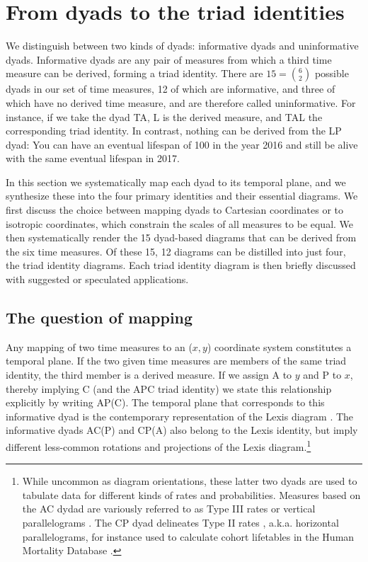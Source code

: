 \documentclass[12pt,oneside,a4paper]{article} %
\begin{document}

\section{From dyads to the triad identities}
We distinguish between two kinds of dyads: informative dyads and uninformative dyads. Informative dyads are any pair of measures from which a third time measure
can be derived, forming a triad identity. There are
$15=\binom{6}{2}$ possible dyads in our set of time measures, 12 of which are
informative, and three of which have no derived time measure, and are therefore
called uninformative. For instance, if we take the dyad TA, L is the derived
measure, and TAL the corresponding triad identity. In
contrast, nothing can be derived from the LP dyad: You can have an eventual lifespan of 100 in the year 2016 and still be alive with the same eventual lifespan in 2017.

In this section we systematically map each dyad to its temporal plane, and we
synthesize these into the four primary identities and their essential diagrams.
We first discuss the choice between mapping dyads to Cartesian coordinates or to
isotropic coordinates, which constrain the scales of all measures to be equal.
We then systematically render the 15 dyad-based diagrams that can be derived from the six time measures. Of these 15, 12 diagrams can be distilled into just four, the triad identity diagrams. Each
triad identity diagram is then briefly discussed with suggested or speculated
applications.

\subsection{The question of mapping}
Any mapping of two time measures to an ($x,y$) coordinate
system constitutes a temporal plane. If the two given time measures are members of the same triad identity, the third member is a derived
measure. If we assign A to $y$ and P to $x$, thereby implying C (and the APC
triad identity) we state this relationship explicitly by writing
AP(C).
The temporal plane that corresponds to this informative dyad is the contemporary representation of the
Lexis diagram \citep{lexis1875einleitung, pressat1961analyse}. The informative
dyads AC(P) and CP(A) also belong to the Lexis identity, but imply different
less-common rotations and projections of the Lexis diagram.\footnote{While
uncommon as diagram orientations, these latter two dyads are used to tabulate
data for different kinds of rates and probabilities. Measures
based on the AC dydad are variously referred to as Type III rates
\citep{caselli2005demography} or vertical parallelograms \citep{HMDMP}. The CP
dyad delineates Type II rates \citep{caselli2005demography}, a.k.a. horizontal
parallelograms, for instance used to calculate cohort lifetables in the Human
Mortality Database \citep{HMDMP}. }
\end{document}
